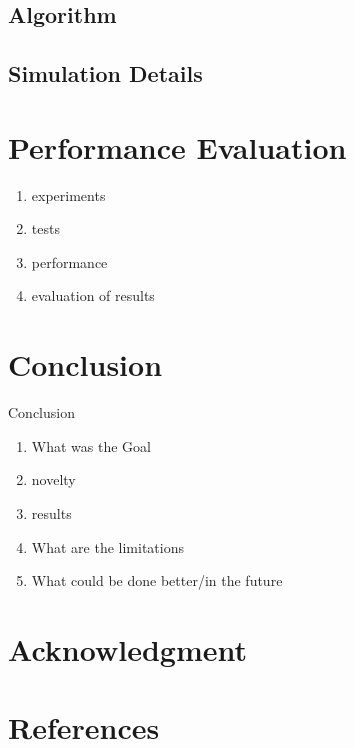\documentclass[conference]{IEEEtran}
\begin{document}
\subsection{Algorithm}
\subsection{Simulation Details}


\section{Performance Evaluation}
\begin{enumerate}
   \item experiments
   \item tests
   \item performance
   \item evaluation of results
\end{enumerate}


\section{Conclusion}

Conclusion
\begin{enumerate}
   \item What was the Goal
   \item novelty
   \item results
   \item What are the limitations
   \item What could be done better/in the future
\end{enumerate}

\section*{Acknowledgment}

\section*{References}
\end{document}
